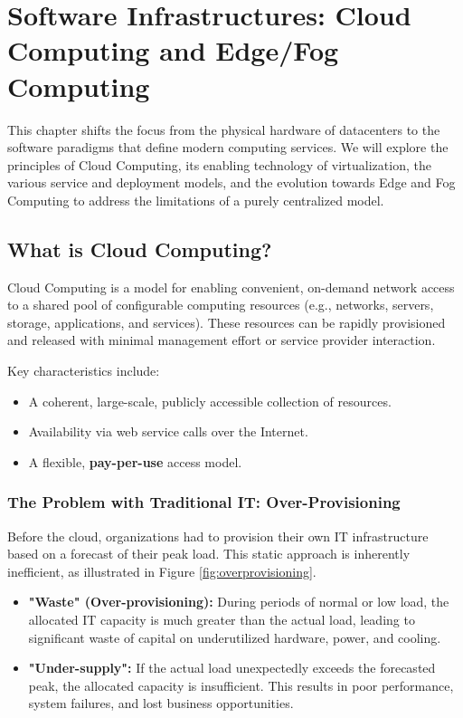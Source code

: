 \chapter{Software Infrastructures: Cloud Computing and Edge/Fog Computing}
\label{chap:sw_infra_cloud}

This chapter shifts the focus from the physical hardware of datacenters to the software paradigms that define modern computing services. We will explore the principles of Cloud Computing, its enabling technology of virtualization, the various service and deployment models, and the evolution towards Edge and Fog Computing to address the limitations of a purely centralized model.

\section{What is Cloud Computing?}
Cloud Computing is a model for enabling convenient, on-demand network access to a shared pool of configurable computing resources (e.g., networks, servers, storage, applications, and services). These resources can be rapidly provisioned and released with minimal management effort or service provider interaction.

Key characteristics include:
\begin{itemize}
    \item A coherent, large-scale, publicly accessible collection of resources.
    \item Availability via web service calls over the Internet.
    \item A flexible, \textbf{pay-per-use} access model.
\end{itemize}

\subsection{The Problem with Traditional IT: Over-Provisioning}
Before the cloud, organizations had to provision their own IT infrastructure based on a forecast of their peak load. This static approach is inherently inefficient, as illustrated in Figure \ref{fig:overprovisioning}.
\begin{itemize}
    \item \textbf{"Waste" (Over-provisioning):} During periods of normal or low load, the allocated IT capacity is much greater than the actual load, leading to significant waste of capital on underutilized hardware, power, and cooling.
    \item \textbf{"Under-supply":} If the actual load unexpectedly exceeds the forecasted peak, the allocated capacity is insufficient. This results in poor performance, system failures, and lost business opportunities.
\end{itemize}

